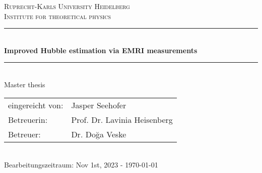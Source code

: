 
\begin{titlepage}
  \begin{center}

    \textsc{\LARGE
      Ruprecht-Karls University Heidelberg}\\[1cm]

    \textsc{Institute for theoretical physics}\\[3cm]

    \rule{\linewidth}{0.5mm}\\[1cm]

    { \huge \bfseries Improved Hubble estimation via EMRI measurements} \\[1cm]

    \rule{\linewidth}{0.5mm}\\[0.5cm]

    Master thesis \\[3cm]

    \begin{tabular}{l l}
      eingereicht von: & Jasper Seehofer              \\
      Betreuerin:      & Prof. Dr. Lavinia Heisenberg \\
      Betreuer:        & Dr. Do\u{g}a Veske           \\
    \end{tabular}\\[1cm]

    Bearbeitungszeitraum: Nov 1st, 2023 - \today
  \end{center}
\end{titlepage}
